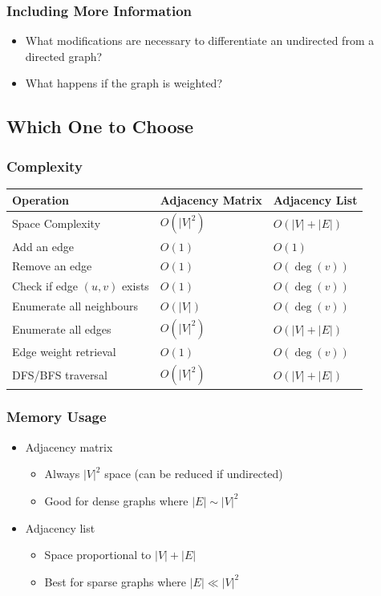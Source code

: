 \documentclass[11pt]{beamer}
\begin{document}
\begin{frame}\frametitle{Including More Information}
\begin{itemize}
\item What modifications are necessary to differentiate an undirected from a directed graph?
\item What happens if the graph is weighted?
\end{itemize}
\end{frame}

\subsection{Which One to Choose}

\begin{frame}\frametitle{Complexity}
\begin{center}
\begin{tabular}{@{} lll @{}}
\toprule
\textbf{Operation} & \textbf{Adjacency Matrix} & \textbf{Adjacency List} \\
\midrule
Space Complexity                 & $O(|V|^2)$           & $O(|V| + |E|)$            \\
Add an edge                      & $O(1)$               & $O(1)$                \\
Remove an edge                   & $O(1)$               & $O(\deg(v))$          \\
Check if edge $(u,v)$ exists     & $O(1)$               & $O(\deg(v))$          \\
Enumerate all neighbours         & $O(|V|)$             & $O(\deg(v))$          \\
Enumerate all edges              & $O(|V|^2)$           & $O(|V| + |E|)$            \\
Edge weight retrieval            & $O(1)$               & $O(\deg(v))$          \\
DFS/BFS traversal                & $O(|V|^2)$           & $O(|V| + |E|)$            \\
\bottomrule
\end{tabular}
\end{center}
\end{frame}

\begin{frame}\frametitle{Memory Usage}
\begin{itemize}
\item Adjacency matrix
    \begin{itemize}
    \item Always $|V|^2$ space (can be reduced if undirected)
    \item Good for dense graphs where $|E| \sim |V|^2$
    \end{itemize}
\item Adjacency list
    \begin{itemize}
    \item Space proportional to $|V| + |E|$
    \item Best for sparse graphs where $|E| \ll |V|^2$
    \end{itemize}
\end{itemize}
\end{frame}
\end{document}
